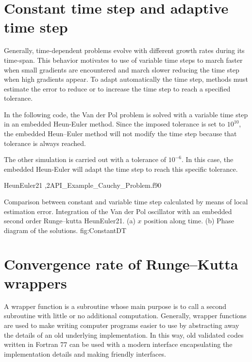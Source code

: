   
  
 \newpage     
 \section{Constant time step and adaptive time step}
  Generally, time-dependent problems evolve with different growth rates during its time-span. This behavior motivates to use of variable time steps to march faster when small gradients are encountered and march slower reducing the time step when high gradients appear. 
 To adapt automatically the time step,  methods must estimate the error to reduce or to increase the time step to reach a specified tolerance.
 
 In the following code, the Van der Pol problem is solved with a variable time step in an embedded Heun-Euler method. 
 Since the imposed tolerance is set to $10^{10}$,  the embedded Heun--Euler method will not modify the time step because that tolerance is always reached.
 
 The other simulation is carried out with a tolerance of $10^{-6}$. In this case, the embedded Heun-Euler will adapt the time step to reach this specific tolerance.   
 
 
 \vspace{0.5cm} 
 {HeunEuler21}
 {,2}{API_Example_Cauchy_Problem.f90}
 
 
 
 \twographs
 {}
 {}
 {Comparison between constant and variable time step calculated by means of local estimation error. 
     Integration of the Van der Pol oscillator with an embedded second order Runge--kutta HeunEuler21.
     (a) $ x $ position along time.
     (b) Phase diagram of the solutions. }
 {fig:ConstantDT} 
 
           
   
  \newpage        
  \section{Convergence rate of Runge--Kutta wrappers}
  A wrapper function is a subroutine whose main purpose is to call a second subroutine with little or no additional computation. Generally, wrapper functions are used to make writing computer programs easier to use by abstracting away the details of an old underlying implementation. In this way, old validated codes written in Fortran 77 can be used with a modern interface encapsulating the implementation details and making friendly interfaces.   
 
